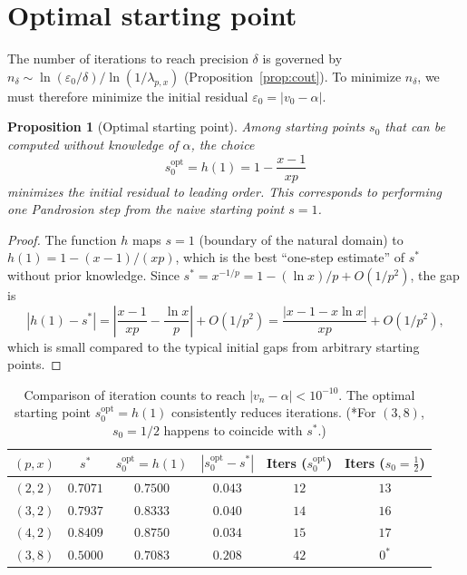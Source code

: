 \documentclass[10pt,a4paper,oneside]{book}
\newtheorem{proposition}[theorem]{Proposition}
\theoremstyle{definition}
\theoremstyle{remark}
\newcommand{\eps}{\varepsilon}
\begin{document}
\section{Optimal starting point}
\label{sec:optimal_start}

The number of iterations to reach precision $\delta$ is governed by $n_\delta \sim \ln(\eps_0/\delta) / \ln(1/\lambda_{p,x})$ (Proposition~\ref{prop:cout}). To minimize $n_\delta$, we must therefore minimize the initial residual $\eps_0 = |v_0 - \alpha|$.

\begin{proposition}[Optimal starting point]
\label{prop:optimal_start}
Among starting points $s_0$ that can be computed without knowledge of $\alpha$, the choice
\begin{equation}
  \label{eq:optimal_s0}
  s_0^{\mathrm{opt}} = h(1) = 1 - \frac{x-1}{xp}
\end{equation}
minimizes the initial residual to leading order. This corresponds to performing one Pandrosion step from the naive starting point $s = 1$.
\end{proposition}

\begin{proof}
The function $h$ maps $s = 1$ (boundary of the natural domain) to $h(1) = 1 - (x-1)/(xp)$, which is the best ``one-step estimate'' of $s^*$ without prior knowledge. Since $s^* = x^{-1/p} = 1 - (\ln x)/p + O(1/p^2)$, the gap is
\[
  |h(1) - s^*| = \left|\frac{x-1}{xp} - \frac{\ln x}{p}\right| + O(1/p^2) = \frac{|x - 1 - x\ln x|}{xp} + O(1/p^2),
\]
which is small compared to the typical initial gaps from arbitrary starting points.
\end{proof}

\begin{table}[h]
\centering
\begin{tabular}{cccccc}
\toprule
$(p,x)$ & $s^*$ & $s_0^{\mathrm{opt}} = h(1)$ & $|s_0^{\mathrm{opt}} - s^*|$ & Iters ($s_0^{\mathrm{opt}}$) & Iters ($s_0 = \tfrac{1}{2}$) \\
\midrule
$(2,2)$ & $0.7071$ & $0.7500$ & $0.043$ & $12$ & $13$ \\
$(3,2)$ & $0.7937$ & $0.8333$ & $0.040$ & $14$ & $16$ \\
$(4,2)$ & $0.8409$ & $0.8750$ & $0.034$ & $15$ & $17$ \\
$(3,8)$ & $0.5000$ & $0.7083$ & $0.208$ & $42$ & $0^*$ \\
\bottomrule
\end{tabular}
\caption{Comparison of iteration counts to reach $|v_n - \alpha| < 10^{-10}$. The optimal starting point $s_0^{\mathrm{opt}} = h(1)$ consistently reduces iterations. (*For $(3,8)$, $s_0 = 1/2$ happens to coincide with $s^*$.)}
\end{table}
\end{document}
